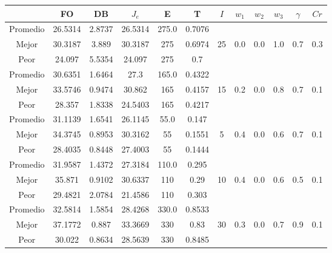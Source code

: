 \begin{table}[h!]
    \footnotesize
    \begin{center}
        \begin{tabular}{|c|c|c|c|c|c|c|c|c|c|c|c|}
        \hline
            & {\bf FO} & {\bf DB} & $J_e$ & {\bf E} & {\bf T} & $I$ & $w_1$ & $w_2$ & $w_3$ & $\gamma$ & $Cr$ \\
        \hline
        \hline
            Promedio  & 26.5314 & 2.8737 & 26.5314 & 275.0 & 0.7076 &  &  &  &  &  & \\
            \cline{1-6}
            Mejor & 30.3187 & 3.889  & 30.3187 & 275 & 0.6974 & 25 & 0.0 & 0.0 & 1.0 & 0.7 & 0.3\\
            \cline{1-6}
            Peor & 24.097 & 5.5354  & 24.097 & 275 & 0.7 &  &  &  &  &  & \\
        \hline
        \hline
            Promedio  & 30.6351 & 1.6464 & 27.3 & 165.0 & 0.4322 &  &  &  &  &  & \\
            \cline{1-6}
            Mejor & 33.5746 & 0.9474  & 30.862 & 165 & 0.4157 & 15 & 0.2 & 0.0 & 0.8 & 0.7 & 0.1\\
            \cline{1-6}
            Peor & 28.357 & 1.8338  & 24.5403 & 165 & 0.4217 &  &  &  &  &  & \\
        \hline
        \hline
            Promedio  & 31.1139 & 1.6541 & 26.1145 & 55.0 & 0.147 &  &  &  &  &  & \\
            \cline{1-6}
            Mejor & 34.3745 & 0.8953  & 30.3162 & 55 & 0.1551 & 5 & 0.4 & 0.0 & 0.6 & 0.7 & 0.1\\
            \cline{1-6}
            Peor & 28.4035 & 0.8448  & 27.4003 & 55 & 0.1444 &  &  &  &  &  & \\
        \hline
        \hline
            Promedio  & 31.9587 & 1.4372 & 27.3184 & 110.0 & 0.295 &  &  &  &  &  & \\
            \cline{1-6}
            Mejor & 35.871 & 0.9102  & 30.6337 & 110 & 0.29 & 10 & 0.4 & 0.0 & 0.6 & 0.5 & 0.1\\
            \cline{1-6}
            Peor & 29.4821 & 2.0784  & 21.4586 & 110 & 0.303 &  &  &  &  &  & \\
        \hline
        \hline
            Promedio  & 32.5814 & 1.5854 & 28.4268 & 330.0 & 0.8533 &  &  &  &  &  & \\
            \cline{1-6}
            Mejor & 37.1772 & 0.887  & 33.3669 & 330 & 0.83 & 30 & 0.3 & 0.0 & 0.7 & 0.9 & 0.1\\
            \cline{1-6}
            Peor & 30.022 & 0.8634  & 28.5639 & 330 & 0.8485 &  &  &  &  &  & \\

\end{tabular}
\end{center}
\end{table}
